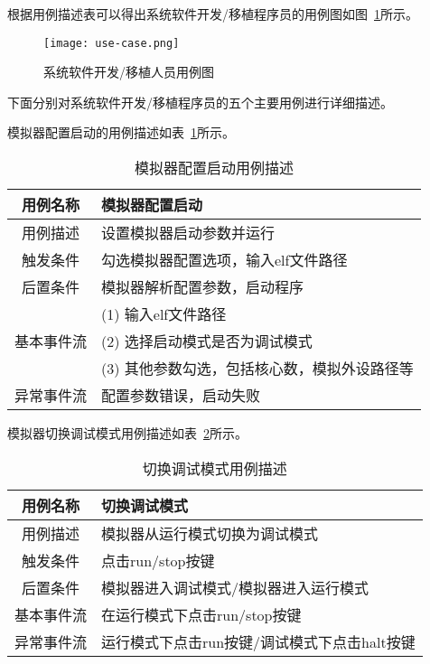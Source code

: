 根据用例描述表可以得出系统软件开发/移植程序员的用例图如图~\ref{fig:use-case}所示。
\begin{figure}[H]
  \centering
  \texttt{[image: use-case.png]}
  \caption{系统软件开发/移植人员用例图}
  \label{fig:use-case}
\end{figure}


下面分别对系统软件开发/移植程序员的五个主要用例进行详细描述。 


模拟器配置启动的用例描述如表~\ref{tab:yongli1}所示。
\begin{table}[H]
  \centering
  \caption{模拟器配置启动用例描述}
  \label{tab:yongli1}
  \renewcommand\arraystretch{1.1}
  \begin{tabular}{cl}
    \toprule
用例名称 &	模拟器配置启动\\
    \midrule
用例描述 &	设置模拟器启动参数并运行\\ \hline
触发条件 &	勾选模拟器配置选项，输入elf文件路径\\ \hline
后置条件 &	模拟器解析配置参数，启动程序\\ \hline
	& (1)	输入elf文件路径 \\
  基本事件流 & (2)	选择启动模式是否为调试模式 \\
 & (3)	其他参数勾选，包括核心数，模拟外设路径等\\ \hline
异常事件流	& 配置参数错误，启动失败\\
    \bottomrule
  \end{tabular}
\end{table}


模拟器切换调试模式用例描述如表~\ref{tab:yongli2}所示。
\begin{table}[H]
  \centering
  \caption{切换调试模式用例描述}
  \label{tab:yongli2}
  \renewcommand\arraystretch{1.1}
  \begin{tabular}{cl}
    \toprule
用例名称	& 切换调试模式\\
    \midrule
用例描述	& 模拟器从运行模式切换为调试模式\\ \hline
触发条件	& 点击run/stop按键\\ \hline
后置条件	& 模拟器进入调试模式/模拟器进入运行模式\\ \hline
基本事件流	& 在运行模式下点击run/stop按键\\ \hline
异常事件流	& 运行模式下点击run按键/调试模式下点击halt按键\\
    \bottomrule
  \end{tabular}
\end{table}


